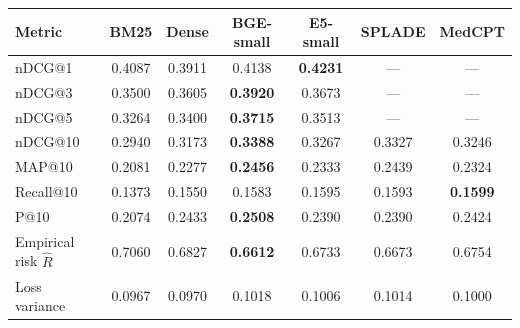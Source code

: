 \begin{tabular}{lSSSSSS}
\toprule
\textbf{Metric} & \textbf{BM25} & \textbf{Dense} & \textbf{BGE-small} & \textbf{E5-small} & \textbf{SPLADE} & \textbf{MedCPT} \\
\midrule
nDCG@1 & 0.4087 & 0.3911 & 0.4138 & \textbf{0.4231} & {---} & {---} \\
nDCG@3 & 0.3500 & 0.3605 & \textbf{0.3920} & 0.3673 & {---} & {---} \\
nDCG@5 & 0.3264 & 0.3400 & \textbf{0.3715} & 0.3513 & {---} & {---} \\
nDCG@10 & 0.2940 & 0.3173 & \textbf{0.3388} & 0.3267 & 0.3327 & 0.3246 \\
\midrule
MAP@10 & 0.2081 & 0.2277 & \textbf{0.2456} & 0.2333 & 0.2439 & 0.2324 \\
Recall@10 & 0.1373 & 0.1550 & 0.1583 & 0.1595 & 0.1593 & \textbf{0.1599} \\
P@10 & 0.2074 & 0.2433 & \textbf{0.2508} & 0.2390 & 0.2390 & 0.2424 \\
\midrule
Empirical risk $\hat{R}$ & 0.7060 & 0.6827 & \textbf{0.6612} & 0.6733 & 0.6673 & 0.6754 \\
Loss variance & 0.0967 & 0.0970 & 0.1018 & 0.1006 & 0.1014 & 0.1000 \\
\bottomrule
\end{tabular}

